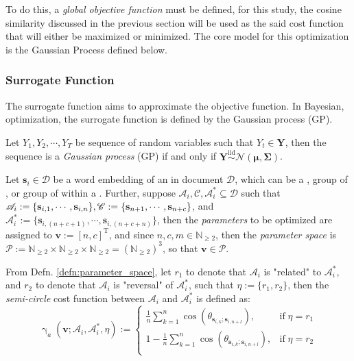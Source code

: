 To do this, a \textit{global objective function} must be defined, for this study, the cosine similarity discussed in the previous section will be used as the said cost function that will either be maximized or minimized. The core model for this optimization is the Gaussian Process defined below.
\subsubsection{Surrogate Function}
The surrogate function aims to approximate the objective function. In Bayesian, optimization, the surrogate function is defined by the Gaussian process (GP).
\begin{defn}\label{defn:gp}
    Let $Y_1,Y_2,\cdots,Y_T$ be sequence of random variables such that $Y_t\in\mathbf{Y}$, then the sequence is a \textit{Gaussian process} (GP) if and only if $\mathbf{Y}\overset{\mathrm{iid}}{\sim}\mathcal{N}(\boldsymbol{\mu}, \boldsymbol{\Sigma})$.
\end{defn}
\begin{defn}\label{defn:parameter_space}
    Let $\mathbf{s}_i\in\mathscr{D}$ be a word embedding of an   in document $\mathscr{D}$, which can be a  , group of  , or group of   within a  . Further, suppose $\mathscr{A}_i,\mathscr{C},\mathscr{A}_i^{*}\subseteq\mathscr{D}$ such that $\mathscr{A}_i:=\{\mathbf{s}_{i,1},\cdots,\mathbf{s}_{i,n}\},\linebreak\mathscr{C}:=\{\mathbf{s}_{n+1},\cdots,\mathbf{s}_{n+c}\}$, and $\mathscr{A}_i^{*}:=\{\mathbf{s}_{i,(n+c+1)},\cdots,\mathbf{s}_{i,(n+c+n)}\}$, then the \textit{parameters} to be optimized are assigned to $\mathbf{v}:=[n,c]^{\text{T}}$, and since $n,c,m\in\mathbb{N}_{\geq 2}$, then the \textit{parameter space} is $\mathscr{P}:=\mathbb{N}_{\geq 2}\times\mathbb{N}_{\geq 2}\times\mathbb{N}_{\geq 2}=(\mathbb{N}_{\geq 2})^3$, so that $\mathbf{v}\in\mathscr{P}$. 
\end{defn}
\begin{defn}\label{defn:semi_circle_cost}
    From Defn. \ref{defn:parameter_space}, let $r_1$ to denote that $\mathscr{A}_i$ is "related" to $\mathscr{A}_i^{*}$, and $r_2$ to denote that $\mathscr{A}_i$ is "reversal" of $\mathscr{A}_i^{*}$, such that $\eta:=\{r_1,r_2\}$, then  the \textit{semi-circle} cost function between $\mathscr{A}_i$ and $\mathscr{A}_i^{*}$ is defined as:
    \begin{equation}
        \operatorname{\gamma}_{a}(\mathbf{v};\mathscr{A}_i,\mathscr{A}_i^{*},\eta):=\begin{cases}
            \frac{1}{n}\sum_{k=1}^{n}\cos\left(\theta_{\mathbf{s}_{i,k};\mathbf{s}_{i,n+l}}\right),&\text{if}\;\eta=r_1\\
            1-\frac{1}{n}\sum_{k=1}^{n}\cos\left(\theta_{\mathbf{s}_{i,k};\mathbf{s}_{i,n+l}}\right),&\text{if}\;\eta=r_2\\
        \end{cases}
    \end{equation}
\end{defn}
